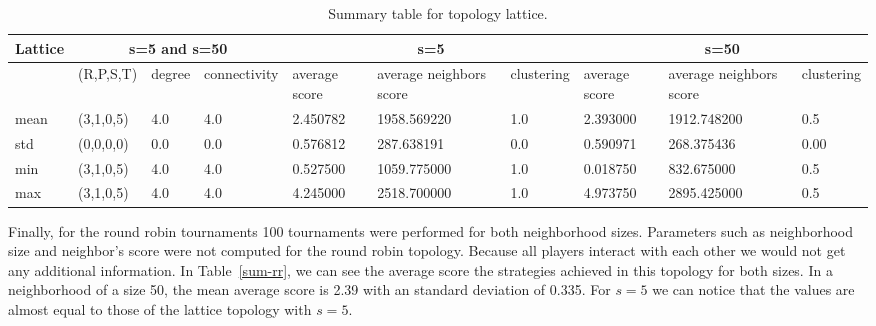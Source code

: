 \begin{table}[!hbtp]
\centering
\begin{adjustbox}{width=1\textwidth}
\small
\begin{tabular}{@{}|l|l|l|l|l|l|l|l|l|l|@{}}
\toprule
Lattice & \multicolumn{3}{c|}{s=5 and s=50} & \multicolumn{3}{c|}{s=5}                             & \multicolumn{3}{c|}{s=50}                            \\ \midrule
       & (R,P,S,T) & degree & connectivity & average score & average neighbors score & clustering & average score & average neighbors score & clustering \\ \midrule
mean   & (3,1,0,5) & 4.0    & 4.0          & 2.450782      & 1958.569220             & 1.0        & 2.393000      & 1912.748200             & 0.5        \\ \midrule
std    & (0,0,0,0) & 0.0    & 0.0          & 0.576812      & 287.638191              & 0.0        & 0.590971      & 268.375436              & 0.00       \\ \midrule
min    & (3,1,0,5) & 4.0    & 4.0          & 0.527500      & 1059.775000             & 1.0        & 0.018750      & 832.675000              & 0.5        \\ \midrule
max    & (3,1,0,5) & 4.0    & 4.0          & 4.245000      & 2518.700000             & 1.0        & 4.973750      & 2895.425000             & 0.5        \\ \bottomrule
\end{tabular}
\end{adjustbox}
\caption{Summary table for topology lattice.}
\label{sum-lattice}
\end{table}

\newpage

Finally, for the round robin tournaments 100 tournaments were performed for both
neighborhood sizes. Parameters such as neighborhood size and neighbor's score
were not computed for the round robin topology. Because all players
interact with each other we would not get any additional information. In
Table~\ref{sum-rr}, we can see the average score the strategies achieved
in this topology for both sizes. In a neighborhood of a size 50, the mean average
score is 2.39 with an standard deviation of 0.335. For \(s=5\) we can notice that the values
are almost equal to those of the lattice topology with \(s=5\).

